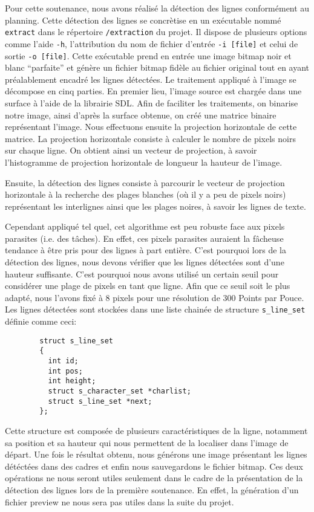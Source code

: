 \documentclass[]{report}
\begin{document}
      Pour cette soutenance, nous avons réalisé la détection des lignes conformément au planning. Cette détection des lignes se concrètise en un exécutable nommé \verb!extract! dans le répertoire \verb!/extraction! du projet. Il dispose de plusieurs options comme l'aide \verb!-h!, l'attribution du nom de fichier d'entrée \verb!-i [file]! et celui de sortie \verb!-o [file]!. Cette exécutable prend en entrée une image bitmap noir et blanc ``parfaite'' et génère un fichier bitmap fidèle au fichier original tout en ayant préalablement encadr\'e les lignes détectées.
      Le traitement appliqué à l'image se décompose en cinq parties. En premier lieu, l'image source est chargée dans une surface à l'aide de la librairie SDL. Afin de faciliter les traitements, on binarise notre image, ainsi d'après la surface obtenue, on créé une matrice binaire représentant l'image. Nous effectuons ensuite la projection horizontale de cette matrice. La projection horizontale consiste à calculer le nombre de pixels noirs sur chaque ligne. On obtient ainsi un vecteur de projection, à savoir l'histogramme de projection horizontale de longueur la hauteur de l'image.

      Ensuite, la détection des lignes consiste à parcourir le vecteur de projection horizontale à la recherche des plages blanches (où il y a peu de pixels noirs) représentant les interlignes ainsi que les plages noires, à savoir les lignes de texte.

      Cependant appliqué tel quel, cet algorithme est peu robuste face aux pixels parasites (i.e. des tâches). En effet, ces pixels parasites auraient la fâcheuse tendance à être pris pour des lignes à part entière. C'est pourquoi lors de la détection des lignes, nous devons vérifier que les lignes détectées sont d'une hauteur suffisante. C'est pourquoi nous avons utilisé un certain seuil pour considérer une plage de pixels en tant que ligne. Afin que ce seuil soit le plus adapté, nous l'avons fixé à $8$ pixels pour une résolution de $300$ Points par Pouce. Les lignes détectées sont stockées dans une liste chainée de structure \verb!s_line_set! définie comme ceci:

      \begin{verbatim}
        struct s_line_set
        {
          int id;
          int pos;
          int height;
          struct s_character_set *charlist;
          struct s_line_set *next;
        };
      \end{verbatim}

      Cette structure est composée de plusieurs caractéristiques de la ligne, notamment sa position et sa hauteur qui nous permettent de la localiser dans l'image de départ.
      Une fois le résultat obtenu, nous générons une image présentant les lignes détéctées dans des cadres et enfin nous sauvegardons le fichier bitmap. Ces deux opérations ne nous seront utiles seulement dans le cadre de la présentation de la détection des lignes lors de la première soutenance. En effet, la génération d'un fichier preview ne nous sera pas utiles dans la suite du projet.
\end{document}
